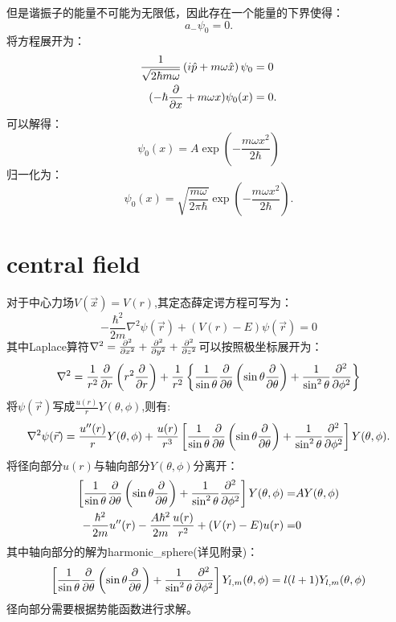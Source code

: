 但是谐振子的能量不可能为无限低，因此存在一个能量的下界使得：
\begin{equation}
    a_-\psi_0=0.
\end{equation}
将方程展开为：
\begin{equation}
    \begin{aligned}
        \frac{1}{\sqrt{2\hbar m\omega}}\left(i\hat{p}+m\omega \hat{x}\right)\psi_0&=0\\
        (-\hbar\frac{\partial }{\partial x}+m\omega x)\psi_0(x)&=0.
    \end{aligned}
\end{equation}
可以解得：
\begin{equation}
    \psi_0(x)=A\exp\left(-\frac{m\omega x^2}{2\hbar}\right)
\end{equation}
归一化为：
\begin{equation}
    \psi_0(x)=\sqrt{\frac{m\omega}{2\pi\hbar}}\exp\left(-\frac{m\omega x^2}{2\hbar}\right).
\end{equation}

\section{central field}
对于中心力场$V(\vec{x})=V(r)$,其定态薛定谔方程可写为：
\begin{equation}
    -\frac{\hbar^2}{2m}\nabla^2\psi(\vec{r})+(V(r)-E)\psi(\vec{r})=0
\end{equation}
其中Laplace算符$\nabla^2=\frac{\partial^2 }{\partial x^2}+\frac{\partial^2 }{\partial y^2}+\frac{\partial^2 }{\partial z^2}$可以按照极坐标展开为：
\begin{equation}
    \nabla^2=\frac{1}{r^2}\frac{\partial }{\partial r}\left(r^2\frac{\partial }{\partial r}\right)+\frac{1}{r^2}\left\lbrace \frac{1}{\sin\theta}\frac{\partial }{\partial \theta}\left(\sin\theta\frac{\partial }{\partial \theta}\right)+\frac{1}{\sin^2\theta}\frac{\partial^2 }{\partial \phi^2}\right\rbrace
\end{equation}
将$\psi(\vec{r})$写成$\frac{u(r)}{r}Y(\theta,\phi)$,则有:
\begin{equation}
    \nabla^2\psi(\vec{r})=\frac{u''(r)}{r}Y(\theta,\phi)+\frac{u(r)}{r^3}\left[ \frac{1}{\sin\theta}\frac{\partial }{\partial \theta}\left(\sin\theta\frac{\partial }{\partial \theta}\right)+\frac{1}{\sin^2\theta}\frac{\partial^2 }{\partial \phi^2}\right]Y(\theta,\phi).
\end{equation}
将径向部分$u(r)$与轴向部分$Y(\theta,\phi)$分离开：
\begin{align}
    \left[ \frac{1}{\sin\theta}\frac{\partial }{\partial \theta}\left(\sin\theta\frac{\partial }{\partial \theta}\right)+\frac{1}{\sin^2\theta}\frac{\partial^2 }{\partial \phi^2}\right]Y(\theta,\phi)=&AY(\theta,\phi)\\
    -\frac{\hbar^2}{2m}u''(r)-\frac{A\hbar^2}{2m}\frac{u(r)}{r^2}+(V(r)-E)u(r)=&0
\end{align}
其中轴向部分的解为\gls{harmonic_sphere}(详见附录)：
\begin{equation}
    \left[ \frac{1}{\sin\theta}\frac{\partial }{\partial \theta}\left(\sin\theta\frac{\partial }{\partial \theta}\right)+\frac{1}{\sin^2\theta}\frac{\partial^2 }{\partial \phi^2}\right]Y_{l,m}(\theta,\phi)=l(l+1)Y_{l,m}(\theta,\phi)
\end{equation}
径向部分需要根据势能函数进行求解。

